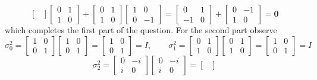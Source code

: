 \documentclass[12pt]{exam}
\begin{document}
\begin{solution}
$$\begin{bmatrix}
    \end{bmatrix}\begin{bmatrix}
        0 & 1 \\ 1 & 0
    \end{bmatrix} + \begin{bmatrix}
        0 & 1 \\ 1 & 0
    \end{bmatrix}\begin{bmatrix}
        1 & 0 \\ 0 & -1
    \end{bmatrix}=\begin{bmatrix}
        0 & 1 \\ -1 & 0
    \end{bmatrix}+\begin{bmatrix}
        0 & -1 \\ 1 & 0
    \end{bmatrix}= \textbf{0}
    $$
    which completes the first part of the question. For the second part observe 
    $$
    \sigma_0^2 = \begin{bmatrix}
        1 & 0 \\ 0 & 1
    \end{bmatrix}\begin{bmatrix}
        1 & 0 \\ 0 & 1
    \end{bmatrix} = \begin{bmatrix}
        1 & 0 \\ 0 & 1
    \end{bmatrix} =I , \quad\quad \sigma_1^2 = \begin{bmatrix}
        0 & 1 \\ 1 & 0
    \end{bmatrix} \begin{bmatrix}
        0 & 1 \\ 1 & 0
    \end{bmatrix}= \begin{bmatrix}
        1 & 0 \\ 0 & 1
    \end{bmatrix} =I
    $$ $$
    \sigma_2^2= \begin{bmatrix}
        0 & -i \\ i & 0
    \end{bmatrix}\begin{bmatrix}
        0 & -i \\ i & 0
    \end{bmatrix} = \begin{bmatrix}

\end{bmatrix}$$
\end{solution}
\end{document}
